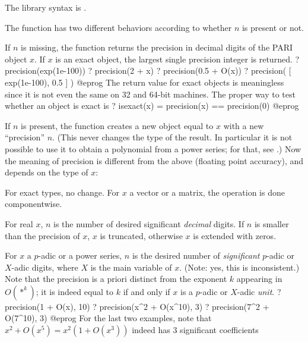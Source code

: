 The library syntax is .

\label{se:precision}
The function has two different behaviors according to whether $n$ is present or not.

If $n$ is missing, the function returns the precision in decimal digits of the
PARI object $x$. If $x$ is
an exact object, the largest single precision integer is returned.
\bprog
? precision(exp(1e-100))
? precision(2 + x)
? precision(0.5 + O(x))
? precision( [ exp(1e-100), 0.5 ] )
@eprog\noindent
The return value for exact objects is meaningless since it is not even the
same on 32 and 64-bit machines. The proper way to test whether an object is
exact is
\bprog
? isexact(x) = precision(x) == precision(0)
@eprog

If $n$ is present, the function creates a new object equal to $x$ with a new
``precision'' $n$. (This never changes the type of the result. In particular
it is not possible to use it to obtain a polynomial from a power series; for
that, see .) Now the meaning of precision is different from the
above (floating point accuracy), and depends on the type of $x$:

For exact types, no change. For $x$ a vector or a matrix, the operation is
done componentwise.

For real $x$, $n$ is the number of desired significant \emph{decimal}
digits. If $n$ is smaller than the precision of $x$, $x$ is truncated,
otherwise $x$ is extended with zeros.

For $x$ a $p$-adic or a power series, $n$ is the desired number of
\emph{significant} $p$-adic or $X$-adic digits, where $X$ is the main
variable of $x$. (Note: yes, this is inconsistent.)
Note that the precision is a priori distinct from the exponent $k$ appearing
in $O(*^k)$; it is indeed equal to $k$ if and only if $x$ is a $p$-adic
or $X$-adic \emph{unit}.
\bprog
? precision(1 + O(x), 10)
? precision(x^2 + O(x^10), 3)
? precision(7^2 + O(7^10), 3)
@eprog\noindent
For the last two examples, note that $x^2 + O(x^5) = x^2(1 + O(x^3))$
indeed has 3 significant coefficients


